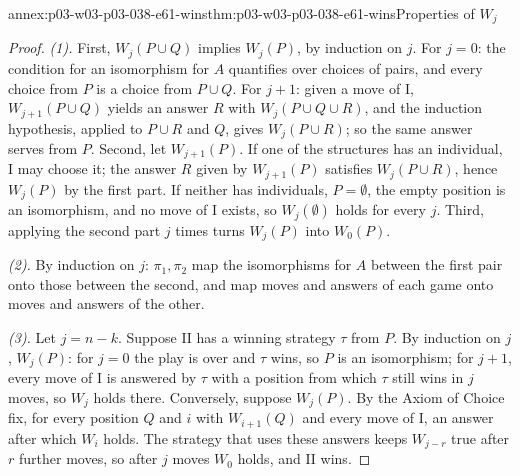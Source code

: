 \begin{annexitem}{annex:p03-w03-p03-038-e61-wins}{thm:p03-w03-p03-038-e61-wins}{Properties of \(W_j\)}
\begin{proof}
\emph{(1).} First, \(W_j(P\cup Q)\) implies \(W_j(P)\), by induction on
\(j\). For \(j=0\): the condition for an isomorphism for \(A\) quantifies
over choices of pairs, and every choice from \(P\) is a choice from
\(P\cup Q\). For \(j+1\): given a move of I, \(W_{j+1}(P\cup Q)\) yields
an answer \(R\) with \(W_j(P\cup Q\cup R)\), and the induction hypothesis,
applied to \(P\cup R\) and \(Q\), gives \(W_j(P\cup R)\); so the same
answer serves from \(P\). Second, let \(W_{j+1}(P)\). If one of the
structures has an individual, I may choose it; the answer \(R\) given by
\(W_{j+1}(P)\) satisfies \(W_j(P\cup R)\), hence \(W_j(P)\) by the first
part. If neither has individuals, \(P=\emptyset\), the empty position is an
isomorphism, and no move of I exists, so \(W_j(\emptyset)\) holds for every
\(j\). Third, applying the second part \(j\) times turns \(W_j(P)\) into
\(W_0(P)\).

\emph{(2).} By induction on \(j\): \(\pi_1,\pi_2\) map the isomorphisms for
\(A\) between the first pair onto those between the second, and map moves
and answers of each game onto moves and answers of the other.

\emph{(3).} Let \(j=n-k\). Suppose II has a winning strategy \(\tau\) from
\(P\). By induction on \(j\), \(W_j(P)\): for \(j=0\) the play is over and
\(\tau\) wins, so \(P\) is an isomorphism; for \(j+1\), every move of I is
answered by \(\tau\) with a position from which \(\tau\) still wins in
\(j\) moves, so \(W_j\) holds there. Conversely, suppose \(W_j(P)\). By the
Axiom of Choice fix, for every position \(Q\) and \(i\) with
\(W_{i+1}(Q)\) and every move of I, an answer after which \(W_i\) holds.
The strategy that uses these answers keeps \(W_{j-r}\) true after \(r\)
further moves, so after \(j\) moves \(W_0\) holds, and II wins.


\end{proof}
\end{annexitem}
